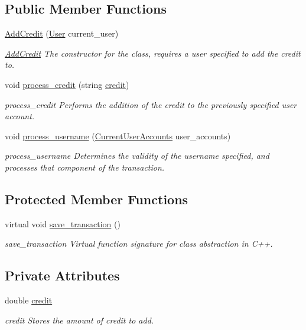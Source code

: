 \subsection*{Public Member Functions}
\begin{DoxyCompactItemize}
\item 
\hyperlink{class_add_credit_a024a07a58635a4f70b71746666ddfbe0}{Add\-Credit} (\hyperlink{class_user}{User} current\-\_\-user)
\begin{DoxyCompactList}\small\item\em \hyperlink{class_add_credit}{Add\-Credit} The constructor for the class, requires a user specified to add the credit to. \end{DoxyCompactList}\item 
void \hyperlink{class_add_credit_a50d6983ac76a6d99fd57444be9732322}{process\-\_\-credit} (string \hyperlink{class_add_credit_aa559c3686bb9d38c3335c16bbea07be8}{credit})
\begin{DoxyCompactList}\small\item\em process\-\_\-credit Performs the addition of the credit to the previously specified user account. \end{DoxyCompactList}\item 
void \hyperlink{class_add_credit_a1b7610d9587f4df88a0c05c578224a75}{process\-\_\-username} (\hyperlink{class_current_user_accounts}{Current\-User\-Accounts} user\-\_\-accounts)
\begin{DoxyCompactList}\small\item\em process\-\_\-username Determines the validity of the username specified, and processes that component of the transaction. \end{DoxyCompactList}\end{DoxyCompactItemize}
\subsection*{Protected Member Functions}
\begin{DoxyCompactItemize}
\item 
virtual void \hyperlink{class_add_credit_a8e5996ad33eb07eef44f55deba6c298e}{save\-\_\-transaction} ()
\begin{DoxyCompactList}\small\item\em save\-\_\-transaction Virtual function signature for class abstraction in C++. \end{DoxyCompactList}\end{DoxyCompactItemize}
\subsection*{Private Attributes}
\begin{DoxyCompactItemize}
\item 
double \hyperlink{class_add_credit_aa559c3686bb9d38c3335c16bbea07be8}{credit}
\begin{DoxyCompactList}\small\item\em credit Stores the amount of credit to add. \end{DoxyCompactList}\end{DoxyCompactItemize}
